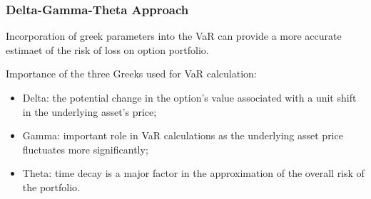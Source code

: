 \documentclass{beamer}
\begin{document}
\begin{frame}
    \frametitle{Delta-Gamma-Theta Approach}
    Incorporation of greek parameters into the VaR can 
    provide a more accurate estimaet of the risk of loss 
    on option portfolio.

    \vspace{0.3cm}
    \pause
    Importance of the three Greeks used for VaR calculation:
    \vspace{0.3cm}
    \pause
    \begin{itemize}
        \item Delta: the potential change 
        in the option's value associated with a 
        unit shift in the underlying asset's price;\pause
        \item Gamma: important role in 
        VaR calculations as the underlying asset price 
        fluctuates more significantly;\pause
        \item Theta: time decay is a major factor
        in the approximation of the overall risk of the portfolio.
    \end{itemize}
\end{frame}
\end{document}
